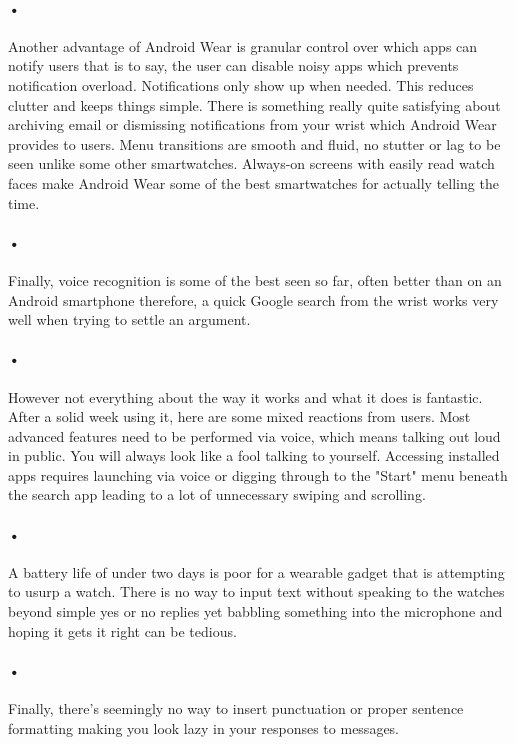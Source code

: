 \documentclass[7pt]{article}
\begin{document}
\paragraph{•}
Another advantage of Android Wear is granular control over which apps can notify users that is to say, the user can disable noisy apps 
which prevents notification overload. Notifications only show up when needed. This reduces clutter and keeps things simple. 
There is something really quite satisfying about archiving email or dismissing notifications from your wrist which Android Wear provides to users.
Menu transitions are smooth and fluid, no stutter or lag to be seen unlike some other smartwatches. Always-on screens with easily read watch faces make Android Wear some of the best smartwatches for actually telling the time.
\paragraph{•}
Finally, voice recognition is some of the best seen so far, often better than on an Android smartphone therefore, a
 quick Google search from the wrist works very well when trying to settle an argument.

\paragraph{•}
However not everything about the way it works and what it does is fantastic. After a solid week using it, 
here are some mixed reactions from users. Most advanced features need to be performed via voice, which means
 talking out loud in public. You will always look like a fool talking to yourself. Accessing installed apps
  requires launching via voice or digging through to the "Start" menu beneath the search app leading to a lot of unnecessary swiping and scrolling.
  
\paragraph{•}
A battery life of under two days is poor for a wearable gadget that is attempting to usurp a watch. There is 
no way to input text without speaking to the watches beyond simple yes or no replies yet babbling something into
 the microphone and hoping it gets it right can be tedious.
    
\paragraph{•} 
Finally, there's seemingly no way to insert punctuation or proper sentence formatting making you look lazy in your responses to messages.
\end{document}
